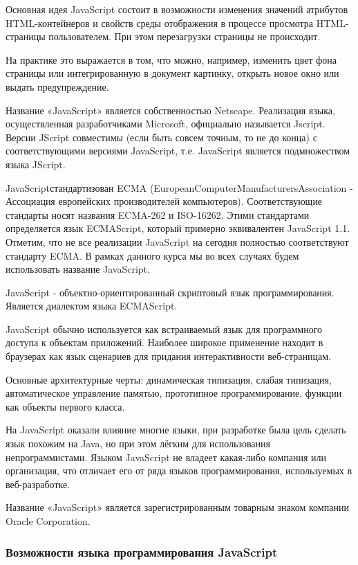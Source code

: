 Основная идея JavaScript состоит в возможности изменения значений атрибутов HTML-контейнеров и свойств среды отображения в процессе просмотра HTML-страницы пользователем. При этом перезагрузки страницы не происходит.

На практике это выражается в том, что можно, например, изменить цвет фона страницы или интегрированную в документ картинку, открыть новое окно или выдать предупреждение.

Название «JavaScript» является собственностью Netscape. Реализация языка, осуществленная разработчиками Microsoft, официально называется Jscript. Версии JScript совместимы (если быть совсем точным, то не до конца) с соответствующими версиями JavaScript, т.е. JavaScript является подмножеством языка JScript.

JavaScriptстандартизован ECMA (European\-Computer\-Manufacturers\-Association - Ассоциация европейских производителей компьютеров). Соответствующие стандарты носят названия ECMA-262 и ISO-16262. Этими стандартами определяется язык ECMAScript, который примерно эквивалентен JavaScript 1.1. Отметим, что не все реализации JavaScript на сегодня полностью соответствуют стандарту ECMA. В рамках данного курса мы во всех случаях будем использовать название JavaScript.

JavaScript - объектно-ориентированный скриптовый язык программирования. Является диалектом языка ECMAScript.

JavaScript обычно используется как встраиваемый язык для программного доступа к объектам приложений. Наиболее широкое применение находит в браузерах как язык сценариев для придания интерактивности веб-страницам.

Основные архитектурные черты: динамическая типизация, слабая типизация, автоматическое управление памятью, прототипное программирование, функции как объекты первого класса.

На JavaScript оказали влияние многие языки, при разработке была цель сделать язык похожим на Java, но при этом лёгким для использования непрограммистами. Языком JavaScript не владеет какая-либо компания или организация, что отличает его от ряда языков программирования, используемых в веб-разработке.

Название «JavaScript» является зарегистрированным товарным знаком компании Oracle Corporation.

\subsubsection{Возможности языка программирования JavaScript}
\


